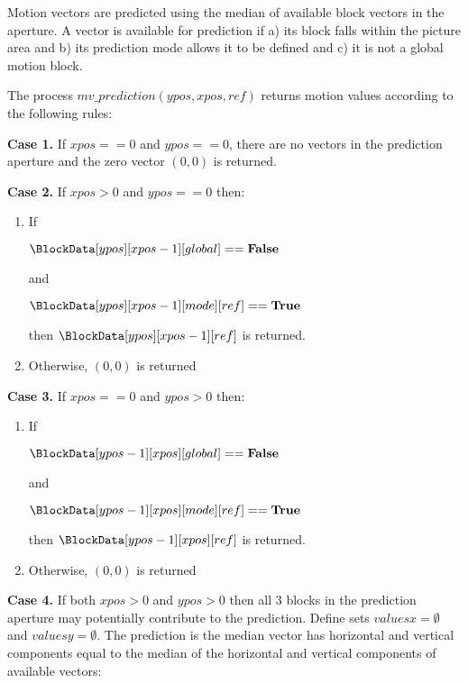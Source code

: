 Motion vectors are predicted using the median of available block vectors in the aperture. A vector is available for
prediction if a) its block falls within the picture area and b) its prediction mode allows it to be defined and c) it
is not a global motion block. 

The process $mv\_prediction(ypos, xpos, ref)$ returns motion values according to
the following rules:

{\bf Case 1.}  If $xpos==0$ and $ypos==0$, there are no vectors in the prediction aperture and
the zero vector $(0, 0)$ is returned.

{\bf Case 2.} If $xpos>0$ and $ypos==0$ then:
\begin{enumerate}
   \item If 

$\BlockData[ypos][xpos-1][global]==\false$ 

and 

$\BlockData[ypos][xpos-1][mode][ref]==\true$ 

then $\BlockData[ypos][xpos-1][ref]$ is returned.
   \item Otherwise, $(0,0)$ is returned
\end{enumerate}

{\bf Case 3.} If $xpos==0$ and $ypos>0$ then:
\begin{enumerate}
   \item If 

$\BlockData[ypos-1][xpos][global]==\false$ 

and 

$\BlockData[ypos-1][xpos][mode][ref]==\true$

then $\BlockData[ypos-1][xpos][ref]$ is returned.
   \item Otherwise, $(0,0)$ is returned
\end{enumerate}

{\bf Case 4.} If both $xpos>0$ and $ypos>0$ then all 3 blocks in the prediction aperture may potentially
contribute to the prediction. Define sets $valuesx=\emptyset$ and $valuesy=\emptyset$. The prediction is the 
median vector has  horizontal and vertical components equal to the median of the horizontal and vertical
components of available vectors:

